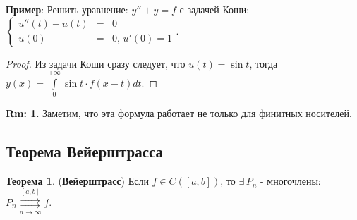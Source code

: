 \documentclass[12pt]{article}
\theoremstyle{definition}
\newtheorem{rem}{Rm:}
\newtheorem{theorem}{Теорема}
\newcommand{\ddint}[2]{\displaystyle\int\limits_{#1}^{#2}}
\newcommand{\uconvm}[2]{\overset{#1}{\underset{#2}{\rightrightarrows}}}
\begin{document}
\textbf{Пример}: Решить уравнение: $y'' + y = f$ с задачей Коши: $\left\{
\begin{array}{rcl}
	u''(t) + u(t) &=& 0\\
	u(0) &=& 0, \, u'(0) = 1
\end{array}
\right.
$.
\begin{proof}
	Из задачи Коши сразу следует, что $u(t) = \sin{t}$, тогда $y(x) = \ddint{0}{+\infty}\sin{t}{\cdot}f(x - t)dt$.
\end{proof}
\begin{rem}
	Заметим, что эта формула работает не только для финитных носителей.
\end{rem}
\newpage
\subsection*{Теорема Вейерштрасса}
\begin{theorem}(\textbf{Вейерштрасс})
	Если $f \in C([a,b])$, то $\exists\, P_n$ - многочлены: $P_n \uconvm{[a,b]}{n \to \infty}f$.
\end{theorem}
\end{document}
